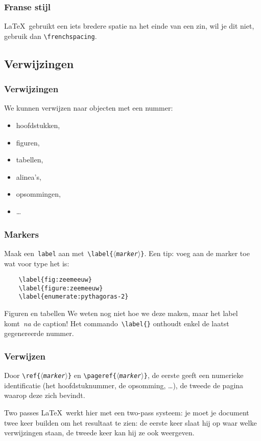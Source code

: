 \begin{frame}
  \frametitle{Franse stijl}

  \LaTeX\ gebruikt een iets bredere spatie na het einde van een zin, wil je dit niet, gebruik dan \texttt{\textcolor{uagreen}{\textbackslash frenchspacing}}.
\end{frame}

\subsection{Verwijzingen}
\begin{frame}
  \frametitle{Verwijzingen}

  We kunnen verwijzen naar objecten met een nummer:
  \begin{itemize}
	  \item hoofdstukken,
	  \item figuren,
	  \item tabellen,
	  \item alinea's,
	  \item opsommingen,
	  \item \ldots
  \end{itemize}
\end{frame}

\begin{frame}[fragile]
  \frametitle{Markers}

  Maak een~\texttt{label} aan met~\texttt{\textcolor{uagreen}{\textbackslash label}\{$\langle$\textsl{marker}$\rangle$\}}. Een tip: voeg aan de marker toe wat voor type het is:
  \begin{verbatim}
	\label{fig:zeemeeuw}
	\label{figure:zeemeeuw}
	\label{enumerate:pythagoras-2}
  \end{verbatim}

  \begin{alertblock}{Figuren en tabellen}
    We weten nog niet hoe we deze maken, maar het label komt~\emph{na} de caption! Het commando~\texttt{\textcolor{uagreen}{\textbackslash label}\{\}} onthoudt enkel de laatst gegenereerde nummer.
  \end{alertblock}
\end{frame}

\begin{frame}[fragile]
  \frametitle{Verwijzen}

  Door \texttt{\textcolor{uagreen}{\textbackslash ref}\{$\langle$\textsl{marker}$\rangle$\}} en \texttt{\textcolor{uagreen}{\textbackslash pageref}\{$\langle$\textsl{marker}$\rangle$\}}, de eerste geeft een numerieke identificatie (het hoofdstuknummer, de opsomming, \ldots), de tweede de pagina waarop deze zich bevindt.

  \begin{exampleblock}{Two passes}
	  \LaTeX\ werkt hier met een two-pass systeem: je moet je document twee keer builden om het resultaat te zien: de eerste keer slaat hij op waar welke verwijzingen staan, de tweede keer kan hij ze ook weergeven.
  \end{exampleblock}
\end{frame}

